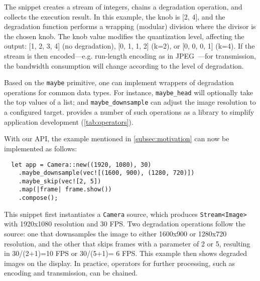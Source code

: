 The snippet creates a stream of integers, chains a degradation operation, and
collects the execution result. In this example, the knob is [2, 4], and the
degradation function performs a wrapping (modular) division where the divisor is
the chosen knob. The knob value modifies the quantization level, affecting the
output: [1, 2, 3, 4] (no degradation), [0, 1, 1, 2] (k=2), or [0, 0, 0, 1]
(k=4). If the stream is then encoded---e.g. run-length encoding as in
JPEG~\cite{wallace1992jpeg}---for transmission, the bandwidth consumption will
change according to the level of degradation.

Based on the \texttt{maybe} primitive, one can implement wrappers of degradation
operations for common data types. For instance, \texttt{maybe\_head} will
optionally take the top values of a list; and \texttt{maybe\_downsample} can
adjust the image resolution to a configured target. \sysname{} provides a number
of such operations as a library to simplify application development
(\autoref{tab:operators}).

With our API, the example mentioned in \autoref{subsec:motivation} can now be
implemented as follows:

\vspace{-2pt}
\begin{lstlisting}
  let app = Camera::new((1920, 1080), 30)
    .maybe_downsample(vec![(1600, 900), (1280, 720)])
    .maybe_skip(vec![2, 5])
    .map(|frame| frame.show())
    .compose();
\end{lstlisting}

This snippet first instantiates a \texttt{Camera} source, which produces
\texttt{Stream<Image>} with 1920x1080 resolution and 30 FPS\@. Two degradation
operations follow the source: one that downsamples the image to either 1600x900
or 1280x720 resolution, and the other that skips frames with a parameter of 2 or
5, resulting in 30/(2+1)=10 FPS or 30/(5+1)= 6 FPS\@. This example then shows
degraded images on the display. In practice, operators for further processing,
such as encoding and transmission, can be chained.


